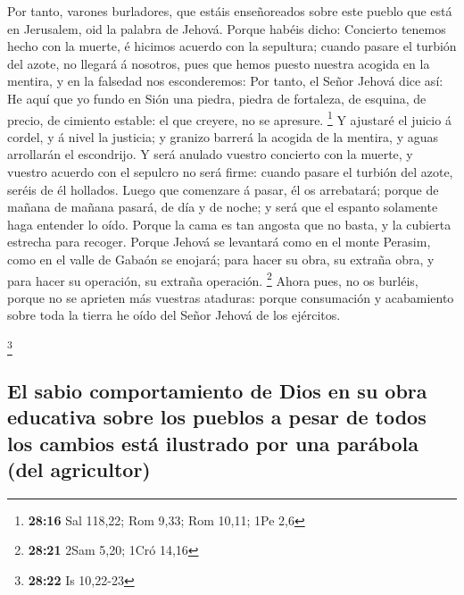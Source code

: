  Por tanto, varones burladores, que estáis enseñoreados
sobre este pueblo que está en Jerusalem, oid la palabra de Jehová.
 Porque habéis dicho: Concierto tenemos hecho con la
muerte, é hicimos acuerdo con la sepultura; cuando pasare el turbión del
azote, no llegará á nosotros, pues que hemos puesto nuestra acogida en
la mentira, y en la falsedad nos esconderemos:  Por
tanto, el Señor Jehová dice así: He aquí que yo fundo en Sión una
piedra, piedra de fortaleza, de esquina, de precio, de cimiento estable:
el que creyere, no se apresure. \footnote{\textbf{28:16} Sal 118,22; Rom
  9,33; Rom 10,11; 1Pe 2,6}  Y ajustaré el juicio á
cordel, y á nivel la justicia; y granizo barrerá la acogida de la
mentira, y aguas arrollarán el escondrijo.  Y será
anulado vuestro concierto con la muerte, y vuestro acuerdo con el
sepulcro no será firme: cuando pasare el turbión del azote, seréis de él
hollados.  Luego que comenzare á pasar, él os arrebatará;
porque de mañana de mañana pasará, de día y de noche; y será que el
espanto solamente haga entender lo oído.  Porque la cama
es tan angosta que no basta, y la cubierta estrecha para recoger.
 Porque Jehová se levantará como en el monte Perasim,
como en el valle de Gabaón se enojará; para hacer su obra, su extraña
obra, y para hacer su operación, su extraña operación. \footnote{\textbf{28:21}
  2Sam 5,20; 1Cró 14,16}  Ahora pues, no os burléis,
porque no se aprieten más vuestras ataduras: porque consumación y
acabamiento sobre toda la tierra he oído del Señor Jehová de los
ejércitos.

\footnote{\textbf{28:22} Is 10,22-23}

\hypertarget{el-sabio-comportamiento-de-dios-en-su-obra-educativa-sobre-los-pueblos-a-pesar-de-todos-los-cambios-estuxe1-ilustrado-por-una-paruxe1bola-del-agricultor}{%
\subsection{El sabio comportamiento de Dios en su obra educativa sobre
los pueblos a pesar de todos los cambios está ilustrado por una parábola
(del
agricultor)}\label{el-sabio-comportamiento-de-dios-en-su-obra-educativa-sobre-los-pueblos-a-pesar-de-todos-los-cambios-estuxe1-ilustrado-por-una-paruxe1bola-del-agricultor}}

